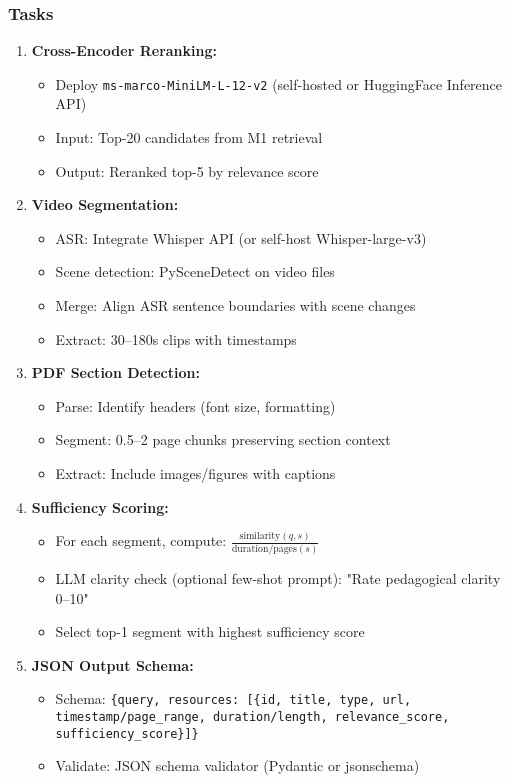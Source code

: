 \documentclass[11pt,letterpaper]{article}
\begin{document}
\subsubsection{Tasks}
\begin{enumerate}
\item \textbf{Cross-Encoder Reranking:}
\begin{itemize}
\item Deploy \texttt{ms-marco-MiniLM-L-12-v2} (self-hosted or HuggingFace Inference API)
\item Input: Top-20 candidates from M1 retrieval
\item Output: Reranked top-5 by relevance score
\end{itemize}

\item \textbf{Video Segmentation:}
\begin{itemize}
\item ASR: Integrate Whisper API (or self-host Whisper-large-v3)
\item Scene detection: PySceneDetect on video files
\item Merge: Align ASR sentence boundaries with scene changes
\item Extract: 30--180s clips with timestamps
\end{itemize}

\item \textbf{PDF Section Detection:}
\begin{itemize}
\item Parse: Identify headers (font size, formatting)
\item Segment: 0.5--2 page chunks preserving section context
\item Extract: Include images/figures with captions
\end{itemize}

\item \textbf{Sufficiency Scoring:}
\begin{itemize}
\item For each segment, compute: $\frac{\text{similarity}(q, s)}{\text{duration/pages}(s)}$
\item LLM clarity check (optional few-shot prompt): "Rate pedagogical clarity 0--10"
\item Select top-1 segment with highest sufficiency score
\end{itemize}

\item \textbf{JSON Output Schema:}
\begin{itemize}
\item Schema: \texttt{\{query, resources: [\{id, title, type, url, timestamp/page\_range, duration/length, relevance\_score, sufficiency\_score\}]\}}
\item Validate: JSON schema validator (Pydantic or jsonschema)
\end{itemize}


\end{enumerate}
\end{document}
